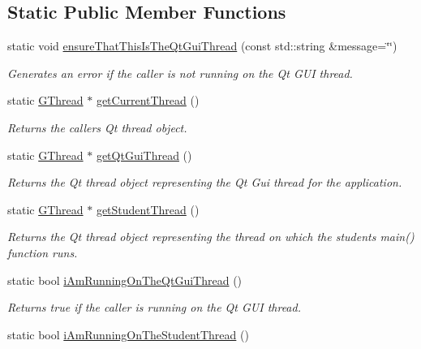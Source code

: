 \subsection*{Static Public Member Functions}
\begin{DoxyCompactItemize}
\item 
static void \mbox{\hyperlink{classGThread_a27a1f5f9657637e4a4b6a7127ca9da33}{ensure\+That\+This\+Is\+The\+Qt\+Gui\+Thread}} (const std\+::string \&message=\char`\"{}\char`\"{})
\begin{DoxyCompactList}\small\item\em Generates an error if the caller is not running on the Qt G\+UI thread. \end{DoxyCompactList}\item 
static \mbox{\hyperlink{classGThread}{G\+Thread}} $\ast$ \mbox{\hyperlink{classGThread_aaa459934e7c2be37d30ed64ab5dd8dbe}{get\+Current\+Thread}} ()
\begin{DoxyCompactList}\small\item\em Returns the caller\textquotesingle{}s Qt thread object. \end{DoxyCompactList}\item 
static \mbox{\hyperlink{classGThread}{G\+Thread}} $\ast$ \mbox{\hyperlink{classGThread_ac141b7dd2d0dfa84f52db332569623fc}{get\+Qt\+Gui\+Thread}} ()
\begin{DoxyCompactList}\small\item\em Returns the Qt thread object representing the Qt Gui thread for the application. \end{DoxyCompactList}\item 
static \mbox{\hyperlink{classGThread}{G\+Thread}} $\ast$ \mbox{\hyperlink{classGThread_ae3c433f1db9de03fe8a6aa83dbc689ed}{get\+Student\+Thread}} ()
\begin{DoxyCompactList}\small\item\em Returns the Qt thread object representing the thread on which the student\textquotesingle{}s main() function runs. \end{DoxyCompactList}\item 
static bool \mbox{\hyperlink{classGThread_a410c93ed2a5eb78ea24013ef35e49eed}{i\+Am\+Running\+On\+The\+Qt\+Gui\+Thread}} ()
\begin{DoxyCompactList}\small\item\em Returns true if the caller is running on the Qt G\+UI thread. \end{DoxyCompactList}\item 
static bool \mbox{\hyperlink{classGThread_a3e60d512067e765b4e2d7c0c5bec39fa}{i\+Am\+Running\+On\+The\+Student\+Thread}} ()

\end{DoxyCompactItemize}
